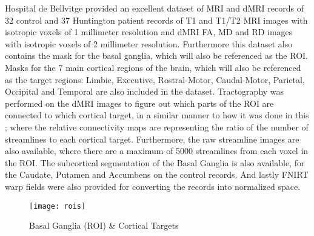  \par

Hospital de Bellvitge provided an excellent dataset of \ac{MRI} and \ac{dMRI} records of 32 control and 37 Huntington patient records of T1 and T1/T2 \ac{MRI} images with isotropic voxels of 1 millimeter resolution and \ac{dMRI} \ac{FA}, \ac{MD} and \ac{RD} images with isotropic voxels of 2 millimeter resolution. Furthermore this dataset also contains the mask for the basal ganglia, which will also be referenced as the \ac{ROI}. Masks for the 7 main cortical regions of the brain, which will also be referenced as the target regions: Limbic, Executive, Rostral-Motor, Caudal-Motor, Parietal, Occipital and Temporal are also included in the dataset. Tractography was performed on the \ac{dMRI} images to figure out which parts of the \ac{ROI} are connected to which cortical target, in a similar manner to how it was done in this ; where the relative connectivity maps are representing the ratio of the number of streamlines to each cortical target. Furthermore, the raw streamline images are also available, where there are a maximum of 5000 streamlines from each voxel in the \ac{ROI}. The subcortical segmentation of the Basal Ganglia is also available, for the Caudate, Putamen and Accumbens on the control records. And lastly \ac{FNIRT} warp fields were also provided for converting the records into normalized space.\par

\begin{figure}[H]
\centering
\texttt{[image: rois]}
\caption{Basal Ganglia (ROI) \& Cortical Targets}
\label{fig:rois}
\end{figure}

